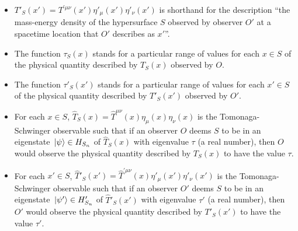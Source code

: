 \begin{itemize}
\item $T'_S(x')={T}^{\prime\mu\nu}(x')\eta'_{\mu}(x')\eta'_{\nu}(x')$ is shorthand for the description ``the mass-energy density of the hypersurface $S$ observed by observer $O'$ at a spacetime location that $O'$ describes as $x'$''. 
\item The function $\tau_S(x)$ stands for a particular range of values for each $x\in S$ of the physical quantity described by $T_S(x)$ observed by $O$. 
\item The function $\tau'_S(x')$ stands for a particular range of values for each $x'\in S$ of the physical quantity described by $T'_S(x')$ observed by $O'$. 
\item For each $x\in S$, $\hat{T}_S(x)=\hat{T}^{\mu\nu}(x)\eta_{\mu}(x)\eta_{\nu}(x)$ is the Tomonaga-Schwinger observable  such that if an observer $O$ deems $S$ to be in an eigenstate $\ket*{\psi}\in H_{S_n}$ of  $\hat{T}_S(x)$ with eigenvalue $\tau$ (a real number), then  $O$ would observe the physical quantity described by  $T_S(x)$ to have the value $\tau$. 
\item For each $x'\in S$, $\hat{T}'_S(x')=\hat{T}^{\prime\mu\nu}(x)\eta'_{\mu}(x')\eta'_{\nu}(x')$ is the Tomonaga-Schwinger observable  such that if an observer $O'$ deems $S$ to be in an eigenstate $\ket*{\psi'}\in H'_{S_n}$ of  $\hat{T}'_S(x')$ with eigenvalue $\tau'$ (a real number), then  $O'$ would observe the physical quantity described by  $T'_S(x')$ to have the value $\tau'$. 
\end{itemize}



